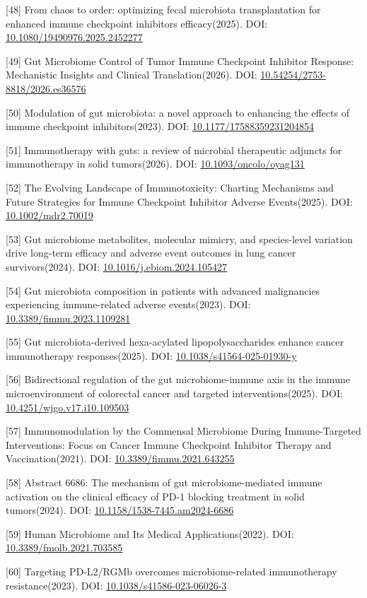 \documentclass[11pt]{article}
\begin{document}
{[}48{]} From chaos to order: optimizing fecal microbiota transplantation for enhanced immune checkpoint inhibitors efficacy(2025). DOI: \url{10.1080/19490976.2025.2452277}

{[}49{]} Gut Microbiome Control of Tumor Immune Checkpoint Inhibitor Response: Mechanistic Insights and Clinical Translation(2026). DOI: \url{10.54254/2753-8818/2026.es36576}

{[}50{]} Modulation of gut microbiota: a novel approach to enhancing the effects of immune checkpoint inhibitors(2023). DOI: \url{10.1177/17588359231204854}

{[}51{]} Immunotherapy with guts: a review of microbial therapeutic adjuncts for immunotherapy in solid tumors(2026). DOI: \url{10.1093/oncolo/oyag131}

{[}52{]} The Evolving Landscape of Immunotoxicity: Charting Mechanisms and Future Strategies for Immune Checkpoint Inhibitor Adverse Events(2025). DOI: \url{10.1002/mdr2.70019}

{[}53{]} Gut microbiome metabolites, molecular mimicry, and species-level variation drive long-term efficacy and adverse event outcomes in lung cancer survivors(2024). DOI: \url{10.1016/j.ebiom.2024.105427}

{[}54{]} Gut microbiota composition in patients with advanced malignancies experiencing immune-related adverse events(2023). DOI: \url{10.3389/fimmu.2023.1109281}

{[}55{]} Gut microbiota-derived hexa-acylated lipopolysaccharides enhance cancer immunotherapy responses(2025). DOI: \url{10.1038/s41564-025-01930-y}

{[}56{]} Bidirectional regulation of the gut microbiome-immune axis in the immune microenvironment of colorectal cancer and targeted interventions(2025). DOI: \url{10.4251/wjgo.v17.i10.109503}

{[}57{]} Immunomodulation by the Commensal Microbiome During Immune-Targeted Interventions: Focus on Cancer Immune Checkpoint Inhibitor Therapy and Vaccination(2021). DOI: \url{10.3389/fimmu.2021.643255}

{[}58{]} Abstract 6686: The mechanism of gut microbiome-mediated immune activation on the clinical efficacy of PD-1 blocking treatment in solid tumors(2024). DOI: \url{10.1158/1538-7445.am2024-6686}

{[}59{]} Human Microbiome and Its Medical Applications(2022). DOI: \url{10.3389/fmolb.2021.703585}

{[}60{]} Targeting PD-L2/RGMb overcomes microbiome-related immunotherapy resistance(2023). DOI: \url{10.1038/s41586-023-06026-3}
\end{document}
